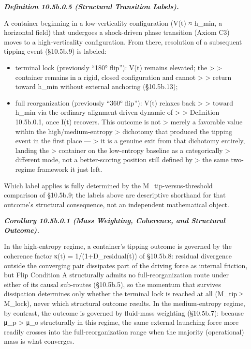 \documentclass[
]{article}
\begin{document}
\emph{\textbf{Definition 10.5b.0.5 (Structural Transition Labels).}}

A container beginning in a low-verticality configuration (V(t) ≈ h\_min,
a horizontal field) that undergoes a shock-driven phase transition
(Axiom C3) moves to a high-verticality configuration. From there,
resolution of a subsequent tipping event (§10.5b.9) is labeled:

\begin{itemize}
\item
  terminal lock (previously ``180° flip''): V(t) remains elevated; the
  \textgreater{} \textgreater{} container remains in a rigid, closed
  configuration and cannot \textgreater{} \textgreater{} return toward
  h\_min without external anchoring (§10.5b.13);
\item
  full reorganization (previously ``360° flip''): V(t) relaxes back
  \textgreater{} \textgreater{} toward h\_min via the ordinary
  alignment-driven dynamic of \textgreater{} \textgreater{} Definition
  10.5b.0.1, once I(t) recovers. This outcome is not \textgreater{}
  merely a favorable value within the high/medium-entropy \textgreater{}
  dichotomy that produced the tipping event in the first place ---
  \textgreater{} it is a genuine exit from that dichotomy entirely,
  landing the \textgreater{} container on the low-entropy baseline as a
  categorically \textgreater{} different mode, not a better-scoring
  position still defined by \textgreater{} the same two-regime framework
  it just left.
\end{itemize}

Which label applies is fully determined by the M\_tip-versus-threshold
comparison of §10.5b.9; the labels above are descriptive shorthand for
that outcome's structural consequence, not an independent mathematical
object.

\emph{\textbf{Corollary 10.5b.0.1 (Mass Weighting, Coherence, and
Structural Outcome).}}

In the high-entropy regime, a container's tipping outcome is governed by
the coherence factor κ(t) = 1/(1+D\_residual(t)) of §10.5b.8: residual
divergence outside the converging pair dissipates part of the driving
force as internal friction, but Flip Condition A structurally admits no
full-reorganization route under either of its causal sub-routes
(§10.5b.5), so the momentum that survives dissipation determines only
whether the terminal lock is reached at all (M\_tip ≥ M\_lock), never
which structural outcome results. In the medium-entropy regime, by
contrast, the outcome is governed by fluid-mass weighting (§10.5b.7):
because μ\_p \textgreater{} μ\_o structurally in this regime, the same
external launching force more readily crosses into the
full-reorganization range when the majority (operational) mass is what
converges.
\end{document}
